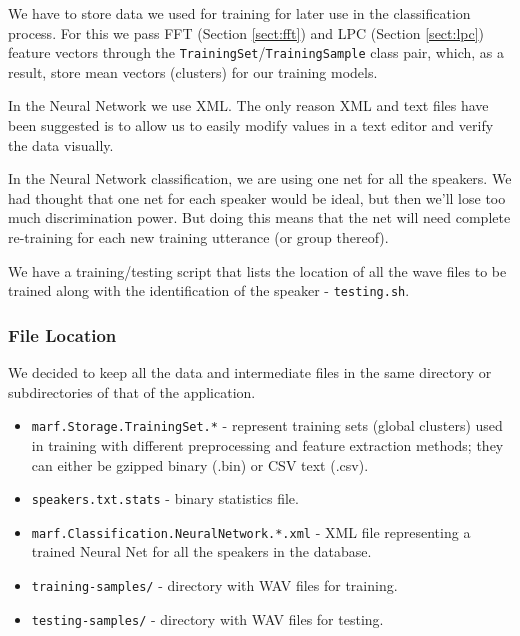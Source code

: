 We have to store data we used for training for later use in
the classification process. For this we pass FFT (Section \ref{sect:fft}) and LPC (Section \ref{sect:lpc})
feature vectors through the \verb+TrainingSet+/\verb+TrainingSample+ class pair,
which, as a result, store mean vectors (clusters) for our training models.

In the Neural Network we use XML. The only reason XML and text files
have been suggested is to allow us to easily modify values in
a text editor and verify the data visually.

In the Neural Network classification, we are using one net for
all the speakers. We had thought that one net for each speaker
would be ideal, but then we'll lose too much discrimination
power. But doing this means that the net will need complete
re-training for each new training utterance (or group thereof).

We have a training/testing script that lists the location of all the wave files to
be trained along with the identification of the speaker - \verb+testing.sh+.



\clearpage

\subsubsection{File Location}

We decided to keep all the data and intermediate files in the same
directory or subdirectories of that of the application.

\begin{itemize}

\item \verb+marf.Storage.TrainingSet.*+ - represent training sets
	(global clusters) used in training with different preprocessing and feature extraction
	methods; they can either be gzipped binary (.bin) or CSV text (.csv).

\item \verb+speakers.txt.stats+ - binary statistics file.

\item \verb+marf.Classification.NeuralNetwork.*.xml+ - XML file representing a trained
	Neural Net for all the speakers in the database.

\item \verb+training-samples/+ - directory with WAV files for training.

\item \verb+testing-samples/+ - directory with WAV files for testing.

\end{itemize}

